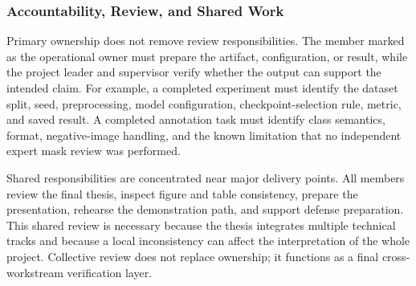 \subsubsection{Accountability, Review, and Shared Work}
Primary ownership does not remove review responsibilities. The member marked as the operational owner must prepare the artifact, configuration, or result, while the project leader and supervisor verify whether the output can support the intended claim. For example, a completed experiment must identify the dataset split, seed, preprocessing, model configuration, checkpoint-selection rule, metric, and saved result. A completed annotation task must identify class semantics, format, negative-image handling, and the known limitation that no independent expert mask review was performed.\par
Shared responsibilities are concentrated near major delivery points. All members review the final thesis, inspect figure and table consistency, prepare the presentation, rehearse the demonstration path, and support defense preparation. This shared review is necessary because the thesis integrates multiple technical tracks and because a local inconsistency can affect the interpretation of the whole project. Collective review does not replace ownership; it functions as a final cross-workstream verification layer.\par
